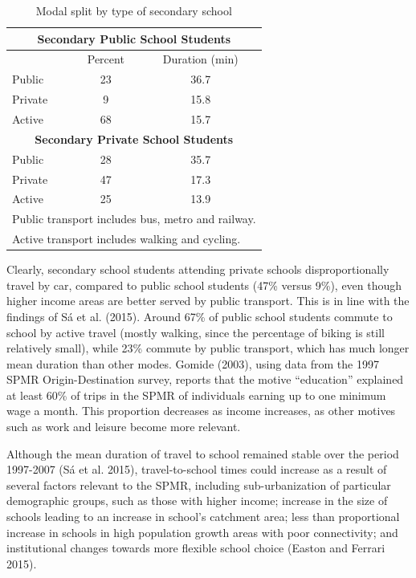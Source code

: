 \documentclass[3p,authoryear,preprint,review,12pt]{elsarticle}
\begin{document}
\begin{table}[H]\centering \caption{Modal split by type of secondary school}
\begin{tabular}{lcc} \hline
\multicolumn{3}{c}{\textbf{Secondary Public School Students}}  \\  \hline
 & Percent & Duration (min)  \\ \hline
Public & 23 & 36.7 \\
Private & 9 & 15.8 \\
Active & 68 & 15.7 \\ \hline
\multicolumn{3}{c}{\textbf{Secondary Private School Students}}  \\  \hline
Public & 28 & 35.7 \\ 
Private & 47 & 17.3 \\
Active & 25 & 13.9 \\\hline
\multicolumn{3}{l}{\small Public transport includes bus, metro and railway.} \\
\multicolumn{3}{l}{\small Active transport includes walking and cycling.}  
\end{tabular}
\end{table} \label{split}
  
Clearly, secondary school students attending private schools disproportionally travel by car, compared to public school students (47\% versus 9\%), even though higher income areas are better served by public transport. This is in line with the findings of
S{á} et al. (2015). Around 67\% of public school students commute to
school by active travel (mostly walking, since the percentage of biking is still relatively small), while 23\% commute by public transport, which has much longer mean duration than other modes. Gomide (2003), using data from the 1997 SPMR Origin-Destination survey, reports that the motive ``education'' explained at least 60\% of trips in the SPMR of individuals earning up to one minimum wage a month. This proportion decreases as income increases, as other motives such as work and leisure become more relevant.

Although the mean duration of travel to school remained stable over the period 1997-2007 (S{á} et al. 2015), travel-to-school times could increase as a result of several factors relevant to the SPMR, including sub-urbanization of particular demographic groups, such as those with higher income; increase in the size of schools leading to an increase in school's catchment area; less than proportional increase in schools in high population growth areas with poor connectivity; and institutional changes towards more flexible school choice (Easton and Ferrari 2015).
\end{document}
